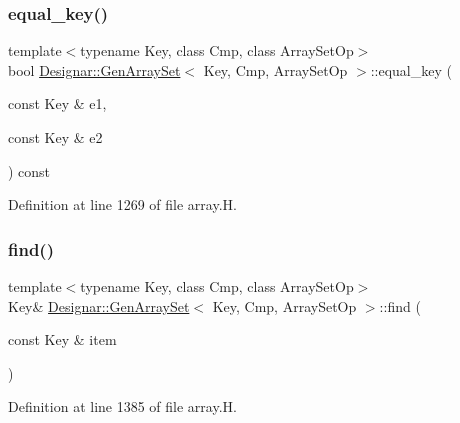 \subsubsection{\texorpdfstring{equal\+\_\+key()}{equal\_key()}}
{\footnotesize\ttfamily template$<$typename Key, class Cmp, class Array\+Set\+Op$>$ \\
bool \hyperlink{class_designar_1_1_gen_array_set}{Designar\+::\+Gen\+Array\+Set}$<$ Key, Cmp, Array\+Set\+Op $>$\+::equal\+\_\+key (\begin{DoxyParamCaption}\item[{const Key \&}]{e1,  }\item[{const Key \&}]{e2 }\end{DoxyParamCaption}) const\hspace{0.3cm}{\ttfamily [inline]}}



Definition at line 1269 of file array.\+H.

\mbox{\label{class_designar_1_1_gen_array_set_a91015348562e7127f2612ad5c13fa016}} 
\subsubsection{\texorpdfstring{find()}{find()}\hspace{0.1cm}{\footnotesize\ttfamily [1/2]}}
{\footnotesize\ttfamily template$<$typename Key, class Cmp, class Array\+Set\+Op$>$ \\
Key\& \hyperlink{class_designar_1_1_gen_array_set}{Designar\+::\+Gen\+Array\+Set}$<$ Key, Cmp, Array\+Set\+Op $>$\+::find (\begin{DoxyParamCaption}\item[{const Key \&}]{item }\end{DoxyParamCaption})\hspace{0.3cm}{\ttfamily [inline]}}



Definition at line 1385 of file array.\+H.

\mbox{\label{class_designar_1_1_gen_array_set_aab0576267b8f88e6e7ec2d31aa768449}} 
